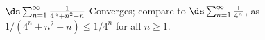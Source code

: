 {$\ds \sum_{n=1}^\infty \frac{1}{4^n+n^2-n}$
}
{Converges; compare to $\ds \sum_{n=1}^\infty \frac{1}{4^n}$, as $1/(4^n+n^2-n) \leq 1/4^n$ for all $n\geq 1$. 
}